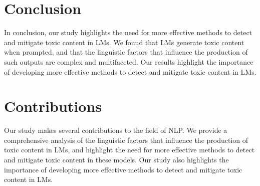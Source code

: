 \documentclass{article}
\begin{document}
\section{Conclusion}
In conclusion, our study highlights the need for more effective methods to detect and mitigate toxic content in LMs. We found that LMs generate toxic content when prompted, and that the linguistic factors that influence the production of such outputs are complex and multifaceted. Our results highlight the importance of developing more effective methods to detect and mitigate toxic content in LMs.

\section{Contributions}
Our study makes several contributions to the field of NLP. We provide a comprehensive analysis of the linguistic factors that influence the production of toxic content in LMs, and highlight the need for more effective methods to detect and mitigate toxic content in these models. Our study also highlights the importance of developing more effective methods to detect and mitigate toxic content in LMs.
\end{document}
